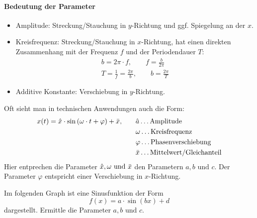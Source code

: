 \paragraph{Bedeutung der Parameter}
\begin{itemize}
  \item[$a:$] Amplitude: Streckung/Stauchung in $y$-Richtung und ggf. Spiegelung an der $x$.
    \item[$b:$] Kreisfrequenz: Streckung/Stauchung in $x$-Richtung, hat einen direkten Zusammenhang mit der Frequenz $f$ und der Periodendauer $T$:
        \begin{align}
            b = 2 \pi \cdot f, \qquad f = \frac{b}{2\pi} \\
            T = \frac{1}{f}=\frac{2\pi}{b}, \qquad b = \frac{2\pi}{T}
        \end{align}
  \item[$c:$]  Additive Konstante: Verschiebung in $y$-Richtung.
\end{itemize}
\noindent
Oft sieht man in technischen Anwendungen auch die Form:
\begin{align*}
    x(t) = \hat{x} \cdot \sin{(\omega \cdot t + \varphi)} + \Bar{x}, 
    \qquad  & \hat{a} \dots  \text{Amplitude}          \\
            & \omega  \dots  \text{Kreisfrequenz}      \\
            & \varphi \dots  \text{Phasenverschiebung} \\
            & \Bar{x} \dots  \text{Mittelwert/Gleichanteil}
\end{align*}
Hier entprechen die Parameter $\hat{x},\omega \text{ und } \Bar{x}$ den Parametern $a,b \text{ und } c$.
Der Parameter $\varphi$ entspricht einer Verschiebung in $x$-Richtung. \\[10pt]
\begin{aufgabe}
    Im folgenden Graph ist eine Sinusfunktion der Form
    \[
        f(x) = a \cdot \sin{(bx)} + d
    \]
    dargestellt. Ermittle die Parameter $a,b \text{ und } c$.

    \begin{center}
    \end{center}
\end{aufgabe}



